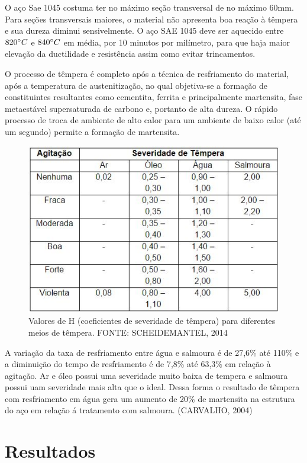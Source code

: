 O aço Sae 1045 costuma ter no máximo seção transversal de no máximo 60mm. Para seções transversais maiores, o material não apresenta boa reação à têmpera e sua dureza diminui sensivelmente. O aço SAE 1045 deve ser aquecido entre $820 \degree C$ e $840 \degree C$ em média, por 10 minutos por milímetro, para que haja maior elevação da ductilidade e resistência assim como evitar trincamentos.

O processo de têmpera é completo após a técnica de resfriamento do material, após a temperatura de austenitização, no qual objetiva-se a formação de constituintes resultantes como cementita, ferrita e principalmente martensita, fase metaestável supersaturada de carbono e, portanto de alta dureza. O rápido processo de troca de ambiente de alto calor para um ambiente de baixo calor (até um segundo) permite a formação de martensita.
\begin{figure}[H]
	\centering
	\label{tab_valoresH}
	\includegraphics[keepaspectratio=true,scale=0.8]{figuras/tab_valoresH.JPG}
	\caption{Valores de H (coeficientes de severidade de têmpera) para diferentes meios de têmpera. FONTE: SCHEIDEMANTEL, 2014}
\end{figure}

A variação da taxa de resfriamento entre água e salmoura é de 27,6\% até 110\% e a diminuição do tempo de resfriamento é de 7,8\% até 63,3\% em relação à agitação. Ar e óleo possui uma severidade muito baixa de tempera e salmoura possui uam severidade mais alta que o ideal. Dessa forma o resultado de têmpera com resfriamento em água gera um aumento de 20\% de martensita na estrutura do aço em relação á tratamento com salmoura. (CARVALHO, 2004)

\chapter[Resultados]{Resultados}
